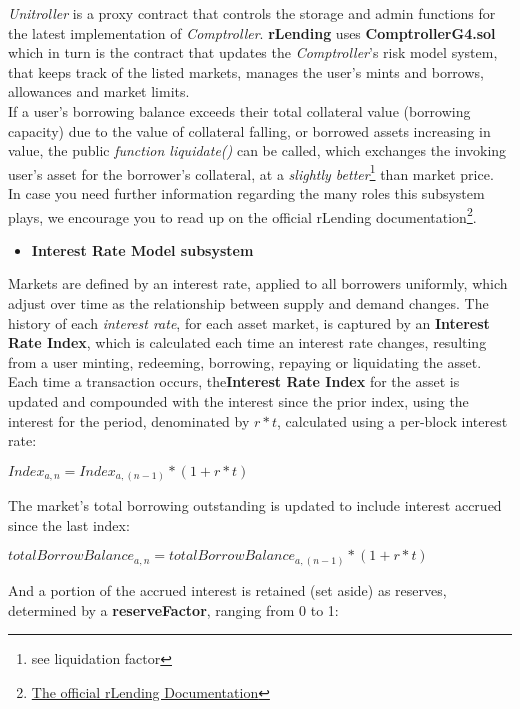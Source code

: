 \documentclass{article}
\begin{document}
\textit{Unitroller} is a proxy contract that controls the storage and admin functions for the latest implementation of \textit{Comptroller}. \textbf{rLending} uses \textbf{ComptrollerG4.sol} which in turn is the contract that updates the \textit{Comptroller}'s risk model system, that keeps track of the listed markets, manages the user's mints and borrows, allowances and market limits.
\\
If a user's borrowing balance exceeds their total collateral value (borrowing capacity) due to the value of collateral falling, or borrowed assets increasing in value, the public \textit{function liquidate()} can be called, which exchanges the invoking user's asset for the borrower's collateral, at a \textit{slightly better}\footnote{see liquidation factor} than market price.
\\
In case you need further information regarding the many roles this subsystem plays, we encourage you to read up on the official rLending documentation\footnote{\href{https://rlending.app/docs}{The official rLending Documentation}}.


\begin{itemize}
\item \textbf{Interest Rate Model subsystem}
\end{itemize}

Markets are defined by an interest rate, applied to all borrowers uniformly, which adjust over time as the relationship between supply and demand changes. The history of each \textit{interest rate}, for each asset market, is captured by an \textbf{Interest Rate Index}, which is calculated each time an interest rate changes, resulting from a user minting, redeeming, borrowing, repaying or liquidating the asset. 
Each time a transaction occurs, the\textbf{Interest Rate Index} for the asset is updated and compounded with the interest since the prior index, using the interest for the period, denominated by $r * t$, calculated using a per-block interest rate:
\begin{center}
$Index_{a,n}= Index_{a,(n-1)}*(1+r*t)$
\end{center}

The market’s total borrowing outstanding is updated to include interest accrued since the last index:

\begin{center}
$totalBorrowBalance_{a,n}= totalBorrowBalance_{a,(n-1)}*(1+r*t)$
\end{center}

And a portion of the accrued interest is retained (set aside) as reserves, determined by a
\textbf{reserveFactor}, ranging from 0 to 1:
\end{document}
